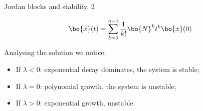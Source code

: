 \documentclass{beamer}
\begin{document}
\begin{frame}{Jordan blocks and stability, 2}
	\begin{flushleft}
		
		\begin{align}
			\bo{x} (t)=  \sum_{k=0}^{n-1} \frac{1}{k!} \bo{N}^k t^k \bo{x} (0)
		\end{align}
		
		Analysing the solution we notice:
		
		\begin{itemize}
			\item If $\lambda < 0$: exponential decay dominates, the system is stable;
			\item If $\lambda = 0$: polynomial growth, the system is unstable;
			\item If $\lambda > 0$: exponential growth, unstable.
		\end{itemize}
		
	\end{flushleft}
\end{frame}
\end{document}
